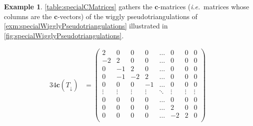 \documentclass{amsart}
\theoremstyle{definition}
\newtheorem{example}[theorem]{Example}
\renewcommand{\b}[1]{{\boldsymbol{#1}}} %
\newcommand{\ie}{\textit{i.e.}~} %
\begin{document}
\begin{example}
\label{exm:specialCMatrices}
\cref{table:specialCMatrices} gathers the $\b{c}$-matrices (\ie matrices whose columns are the $\b{c}$-vectors) of the wiggly pseudotriangulations of \cref{exm:specialWigglyPseudotriangulations} illustrated in \cref{fig:specialWigglyPseudotriangulations}.

\begin{table}
	\begingroup
	\fontsize{10}{10.5}\selectfont
	\setlength\arraycolsep{1.1pt}
	\begin{alignat*}{3}
	4\b{c}(T_\downarrow) & = \begin{pmatrix}
		2 & 0 & 0 & 0 & \dots & 0 & 0 & 0 \\
		-2 & 2 & 0 & 0 & \dots & 0 & 0 & 0 \\
		0 & -1 & 2 & 0 & \dots & 0 & 0 & 0 \\
		0 & -1 & -2 & 2 & \dots & 0 & 0 & 0 \\
		0 & 0 & 0 & -1 & \dots & 0 & 0 & 0 \\
		\vdots & \vdots & \vdots & \vdots & \ddots & \vdots & \vdots & \vdots \\
		0 & 0 & 0 & 0 & \dots & 0 & 0 & 0 \\
		0 & 0 & 0& 0 & \dots & 2 & 0 & 0 \\
		0 & 0 & 0 & 0 & \dots & -2 & 2 & 0 \\

\end{pmatrix}
\end{alignat*}
\end{table}
\end{example}
\end{document}
